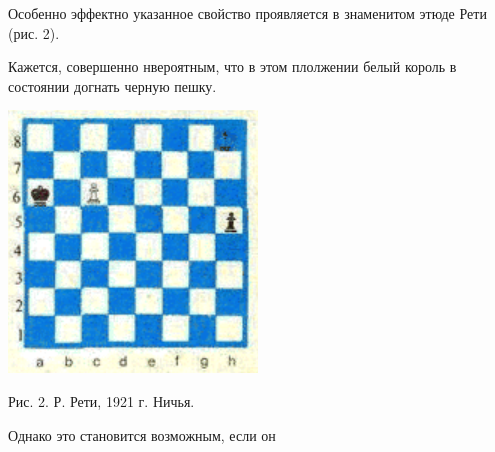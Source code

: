 \begin{multicols}{3}
Особенно эффектно указанное свойство проявляется в знаменитом этюде Рети (рис. 2).

Кажется, совершенно нвероятным, что в этом плолжении белый король в состоянии догнать черную пешку.

\begin{flushleft}
    \includegraphics[width=\linewidth]{img2.png}
\end{flushleft}

\begin{flushleft}
Рис. 2. Р. Рети, 1921 г. 
Ничья.
\end{flushleft} 
Однако это становится возможным, если он


\end{multicols}